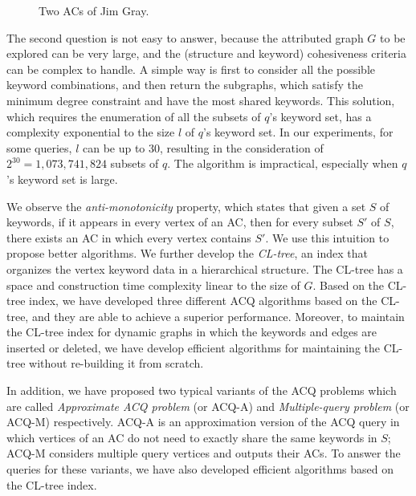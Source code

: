 \begin{figure}[ht]
{{            \label{fig:jim2}
        }
    }
    \caption{Two ACs of Jim Gray.}\label{fig:jim}
\end{figure}

The second question is not easy to answer, because the attributed graph $G$ to be explored can be very large, and the (structure and keyword) cohesiveness criteria can be complex to handle. A simple way is first to consider all the possible keyword combinations, and then return the subgraphs, which satisfy the minimum degree constraint and have the most shared keywords. This solution, which requires the enumeration of all the subsets of $q$'s keyword set, has a complexity exponential to the size $l$ of $q$'s keyword set. In our experiments, for some queries, $l$ can be up to 30, resulting in the consideration of $2^{30}=1,073,741,824$ subsets of $q$. The algorithm is impractical, especially when $q$'s keyword set is large.

{\color{blue}
We observe the {\it anti-monotonicity} property, which states that given a set $S$ of keywords, if it appears in every vertex of an AC, then for every subset $S'$ of $S$, there exists an AC in which every vertex contains $S'$. We use this intuition to propose better algorithms. We further develop the \emph{CL-tree}, an index that organizes the vertex keyword data in a hierarchical structure. The CL-tree has a space and construction time complexity linear to the size of $G$.
Based on the CL-tree index, we have developed three different ACQ algorithms based on the CL-tree, and they are able to achieve a superior performance.
Moreover, to maintain the CL-tree index for dynamic graphs in which the keywords and edges are inserted or deleted, we have develop efficient algorithms for maintaining the CL-tree without re-building it from scratch.

In addition, we have proposed two typical variants of the ACQ problems which are called {\it Approximate ACQ problem} (or ACQ-A) and {\it Multiple-query problem} (or ACQ-M) respectively. ACQ-A is an approximation version of the ACQ query in which vertices of an AC do not need to exactly share the same keywords in $S$;
ACQ-M considers multiple query vertices and outputs their ACs.
To answer the queries for these variants, we have also developed efficient algorithms based on the CL-tree index.
}


